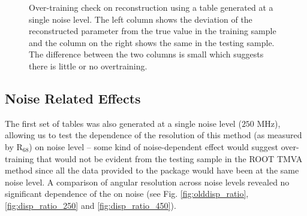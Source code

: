\documentclass[main.tex]{subfiles}
\begin{document}
\begin{figure}[H]
{    \label{fig:dispErr_test_overtraining}
  }
  \caption[Over-training test.]{Over-training check on reconstruction using a \disp table generated at a single noise level. The left column shows the deviation of the reconstructed parameter from the true value in the training sample and the column on the right shows the same in the testing sample. The difference between the two columns is small which suggests there is little or no overtraining.}
  \label{fig:overtraining}
\end{figure}

\subsection{Noise Related Effects}
The first set of \disp tables was also generated at a single noise level ($250$ MHz), allowing us to test the dependence of the resolution of this method (as measured by R$_{68}$) on noise level -- some kind of noise-dependent effect would suggest over-training that would not be evident from the testing sample in the ROOT TMVA method since all the data provided to the package would have been at the same noise level. A comparison of angular resolution across noise levels revealed no significant dependence of the \rse on noise (see Fig. \ref{fig:olddisp_ratio}, \ref{fig:disp_ratio_250} and \ref{fig:disp_ratio_450}).
\end{document}

